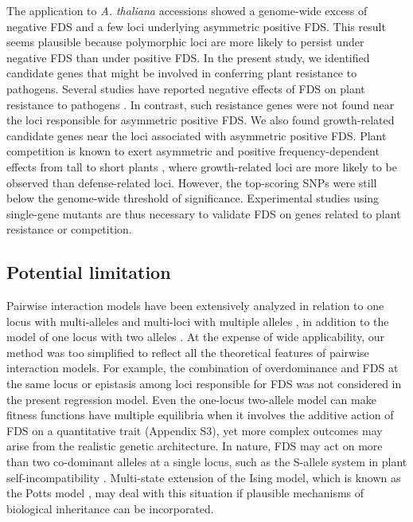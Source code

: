 \documentclass[12pt,]{article}
\begin{document}
The application to \textit{A. thaliana} accessions showed a genome-wide excess of negative FDS and a few loci underlying asymmetric positive FDS. This result seems plausible because polymorphic loci are more likely to persist under negative FDS than under positive FDS. In the present study, we identified candidate genes that might be involved in conferring plant resistance to pathogens. Several studies have reported negative effects of FDS on plant resistance to pathogens \citep{antonovics1984experimental, brunet2000disease}. In contrast, such resistance genes were not found near the loci responsible for asymmetric positive FDS. We also found growth-related candidate genes near the loci associated with asymmetric positive FDS. Plant competition is known to exert asymmetric and positive frequency-dependent effects from tall to short plants \citep{weiner1990asymmetric}, where growth-related loci are more likely to be observed than defense-related loci. However, the top-scoring SNPs were still below the genome-wide threshold of significance. Experimental studies using single-gene mutants are thus necessary to validate FDS on genes related to plant resistance or competition.

\subsection{Potential limitation}
Pairwise interaction models have been extensively analyzed in relation to one locus with multi-alleles \citep{schneider2006multilocus, trotter2007frequency} and multi-loci with multiple alleles \citep{schneider2010maximization}, in addition to the model of one locus with two alleles \citep{cockerham1972frequency, asmussen_frequency-dependent_1990, schneider_maximization_2008}. At the expense of wide applicability, our method was too simplified to reflect all the theoretical features of pairwise interaction models. For example, the combination of overdominance and FDS at the same locus or epistasis among loci responsible for FDS was not considered in the present regression model. Even the one-locus two-allele model can make fitness functions have multiple equilibria when it involves the additive action of FDS on a quantitative trait (Appendix S3), yet more complex outcomes may arise from the realistic genetic architecture. In nature, FDS may act on more than two co-dominant alleles at a single locus, such as the S-allele system in plant self-incompatibility \citep{hatakeyama1998dominance, shimizu2015evolution}. Multi-state extension of the Ising model, which is known as the Potts model \citep{potts_1952}, may deal with this situation if plausible mechanisms of biological inheritance can be incorporated. 
\end{document}
